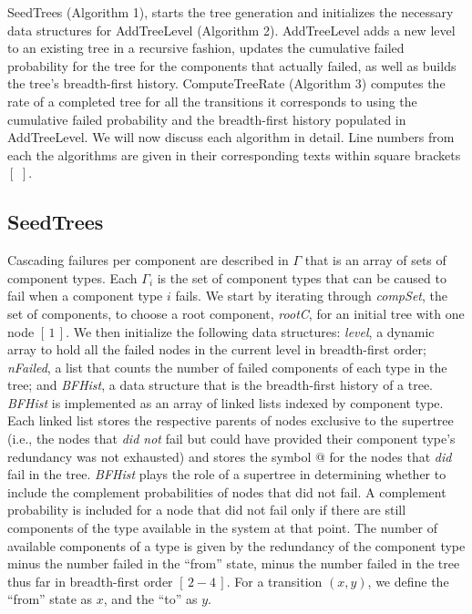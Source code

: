 \documentclass[12pt]{article}
\newcommand{\citeLine}[1]{$[\,#1\,]$}
\newcommand{\citeBlock}[2]{$[\,#1 - #2\,]$}
\begin{document}
SeedTrees (Algorithm 1), starts the tree generation and initializes the necessary data structures for AddTreeLevel (Algorithm 2). AddTreeLevel adds a new level to an existing tree in a recursive fashion, updates the cumulative failed probability for the tree for the components that actually failed, as well as builds the tree's breadth-first history. ComputeTreeRate (Algorithm 3) computes the rate of a completed tree for all the transitions it corresponds to using the cumulative failed probability and the breadth-first history populated in AddTreeLevel. We will now discuss each algorithm in detail. Line numbers from each the algorithms are given in their corresponding texts within square brackets \citeLine{}.

\subsection{SeedTrees}

Cascading failures per component are described in $\Gamma$ that is an array of sets of component types. Each $\Gamma_i$ is the set of component types that can be caused to fail when a component type $i$ fails. We start by iterating through \textit{compSet}, the set of components, to choose a root component, \textit{rootC}, for an initial tree with one node \citeLine{1}. We then initialize the following data structures: \textit{level}, a dynamic array to hold all the failed nodes in the current level in breadth-first order; \textit{nFailed}, a list that counts the number of failed components of each type in the tree; and \textit{BFHist}, a data structure that is the breadth-first history of a tree. \textit{BFHist} is implemented as an array of linked lists indexed by component type. Each linked list stores the respective parents of nodes exclusive to the supertree (i.e., the nodes that \textit{did not} fail but could have provided their component type's redundancy was not exhausted) and stores the symbol @ for the nodes that \textit{did} fail in the tree. \textit{BFHist} plays the role of a supertree in determining whether to include the complement probabilities of nodes that did not fail. A complement probability is included for a node that did not fail only if there are still components of the type available in the system at that point. The number of available components of a type is given by the redundancy of the component type minus the number failed in the ``from'' state, minus the number failed in the tree thus far in breadth-first order \citeBlock{2}{4}. For a transition $(x,y)$, we define the ``from'' state as $x$, and the ``to'' as $y$.
\end{document}
